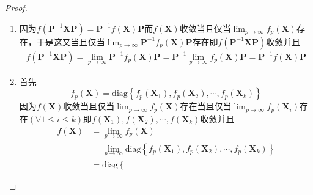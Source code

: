 {\begin{proof}
        \begin{enumerate}[label=\arabic*）]
            \item 因为$f\left(
                      \bm{P}^{-1}\bm{X}\bm{P}
                      \right)=
                      \bm{P}^{-1}f\left(\bm{X}\right)\bm{P}
                  $而$f\left(\bm{X}\right)$收敛当且仅当$\displaystyle \lim_{p\to\infty}f_p\left(\bm{X}\right)$存在，于是这又当且仅当$\displaystyle \lim_{p\to\infty}\bm{P}^{-1}f_p\left(\bm{X}\right)\bm{P}$存在即$f\left(
                      \bm{P}^{-1}\bm{X}\bm{P}
                      \right)$收敛并且\begin{align*}
                      f\left(
                      \bm{P}^{-1}\bm{X}\bm{P}
                      \right)=\lim_{p\to\infty}\bm{P}^{-1}f_p\left(\bm{X}\right)\bm{P}=\bm{P}^{-1}\lim_{p\to\infty}f_p\left(\bm{X}\right)\bm{P}=\bm{P}^{-1}f\left(\bm{X}\right)\bm{P}
                  \end{align*}
            \item 首先\[
                      f_p\left(\bm{X}\right)=\mathrm{diag}\left\{
                      f_p\left(
                      \bm{X}_1
                      \right),f_p\left(
                      \bm{X}_2
                      \right),\cdots,f_p\left(
                      \bm{X}_k
                      \right)
                      \right\}
                  \]因为$f\left(\bm{X}\right)$收敛当且仅当$\displaystyle \lim_{p\to\infty}f_p\left(\bm{X}\right)$存在当且仅当$\displaystyle \lim_{p\to\infty}f_p\left(
                      \bm{X}_i
                      \right)$存在$\left(\forall
                      1\leqslant i\leqslant k
                      \right)$即$f\left(
                      \bm{X}_1
                      \right),f\left(
                      \bm{X}_2
                      \right),\cdots,f\left(
                      \bm{X}_k
                      \right)$收敛并且\begin{align*}
                      f\left(\bm{X}\right) & =\lim_{p\to\infty}f_p\left(\bm{X}\right) \\
                                           & =\lim_{p\to\infty}\mathrm{diag}\left\{
                      f_p\left(
                      \bm{X}_1
                      \right),f_p\left(
                      \bm{X}_2
                      \right),\cdots,f_p\left(
                      \bm{X}_k
                      \right)
                      \right\}                                                        \\
                                           & =\mathrm{diag}\left\{

\end{align*}
\end{enumerate}
\end{proof}}
